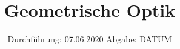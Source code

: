 
\usepackage{color}
\subject{408}
\title{Geometrische Optik}
\date{%
  Durchführung: 07.06.2020
  \hspace{3em}
  Abgabe: DATUM
}



\maketitle
\thispagestyle{empty}
\tableofcontents
\newpage






\nocite{V408}
\printbibliography{}


